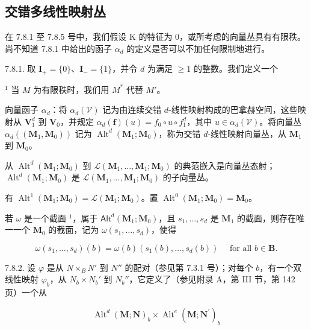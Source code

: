 \subsection{交错多线性映射丛}

在 7.8.1 至 7.8.5 号中，我们假设 K 的特征为 0，或所考虑的向量丛具有有限秩。尚不知道 7.8.1 中给出的函子 \(\alpha_{d}\) 的定义是否可以不加任何限制地进行。

7.8.1. 取 \(\mathbf{I}_{+} = \{0\}\)、\(\mathbf{I}_{-} = \{1\}\)，并令 \(d\) 为满足 \(\geqslant 1\) 的整数。我们定义一个

\(^{1}\) 当 \(M\) 为有限秩时，我们用 \(M^{*}\) 代替 \(M'\)。

向量函子 \(\alpha_{d}\)：将 \(\alpha_{d}(\mathcal{V})\) 记为由连续交错 \(d\)-线性映射构成的巴拿赫空间，这些映射从 \(\mathbf{V}_{1}^{d}\) 到 \(\mathbf{V}_{0}\)，并规定 \(\alpha_{d}(\mathbf{f})(u) = f_{0} \circ u \circ f_{1}^{d}\)，其中 \(u \in \alpha_{d}(\mathcal{V})\)。将向量丛 \(\alpha_{d}((\mathbf{M}_{1}, \mathbf{M}_{0}))\) 记为 \(\operatorname{Alt}^{d}(\mathbf{M}_{1}; \mathbf{M}_{0})\)，称为交错 \(d\)-线性映射向量丛，从 \(\mathbf{M}_{1}\) 到 \(\mathbf{M}_{0}\)。

从 \(\operatorname{Alt}^{d}(\mathbf{M}_{1};\mathbf{M}_{0})\) 到 \(\mathcal{L}(\mathbf{M}_{1},\ldots,\mathbf{M}_{1};\mathbf{M}_{0})\) 的典范嵌入是向量丛态射；\(\operatorname{Alt}^{d}(\mathbf{M}_{1};\mathbf{M}_{0})\) 是 \(\mathcal{L}(\mathbf{M}_{1},\ldots,\mathbf{M}_{1};\mathbf{M}_{0})\) 的子向量丛。

有 \(\operatorname{Alt}^1 (\mathbf{M}_1;\mathbf{M}_0) = \mathcal{L}(\mathbf{M}_1;\mathbf{M}_0)\)。置 \(\operatorname{Alt}^0 (\mathbf{M}_1;\mathbf{M}_0) = \mathbf{M}_0\)。

若 \(\omega\) 是一个截面 \(^{1}\)，属于 \(\mathsf{Alt}^{d}(\mathbf{M}_{1};\mathbf{M}_{0})\)，且 \(s_{1},\ldots,s_{d}\) 是 \(\mathbf{M}_{1}\) 的截面，则存在唯一一个 \(\mathbf{M}_{0}\) 的截面，记为 \(\omega(s_{1},\ldots,s_{d})\)，使得

\[
\omega (s _ {1}, \dots , s _ {d}) (b) = \omega (b) (s _ {1} (b), \dots , s _ {d} (b)) \quad \text { for all } b \in \mathbf {B}.
\]

7.8.2. 设 \(\varphi\) 是从 \(N \times_{B} N'\) 到 \(N''\) 的配对（参见第 7.3.1 号）；对每个 \(b\)，有一个双线性映射 \(\varphi_b\)，从 \(N_b \times N_b'\) 到 \(N_b''\)，它定义了（参见附录 A，第 III 节，第 142 页）一个从

\[
\operatorname{Alt} ^ {d} (\mathbf {M}; \mathbf {N}) _ {b} \times \operatorname{Alt} ^ {e} (\mathbf {M}; \mathbf {N} ^ {\prime}) _ {b}
\]

